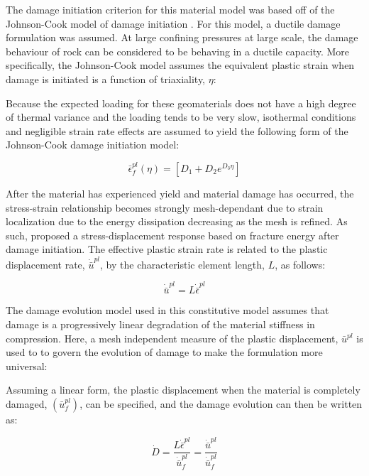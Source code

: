 The damage initiation criterion for this material model was based off of the Johnson-Cook model of damage initiation \cite{Johnson_1985}. For this model, a ductile damage formulation was assumed. At large confining pressures at large scale, the damage behaviour of rock can be considered to be behaving in a ductile capacity. More specifically, the Johnson-Cook model assumes the equivalent plastic strain when damage is initiated is a function of triaxiality, $\eta$:

Because the expected loading for these geomaterials does not have a high degree of thermal variance and the loading tends to be very slow, isothermal conditions and negligible strain rate effects are assumed to yield the following form of the Johnson-Cook damage initiation model:

\begin{equation}
\bar{\epsilon}_{f}^{pl}\left(\eta\right)=\left[D_{1}+D_{2}e^{D_{3}\eta}\right]\label{eqn:druc8}
\end{equation}

After the material has experienced yield and material damage has occurred, the stress-strain relationship becomes strongly mesh-dependant due to strain localization due to the energy dissipation decreasing as the mesh is refined. As such, \citet{Hillerborg_1976} proposed a stress-displacement response based on fracture energy after damage initiation. The effective plastic strain rate is related to the plastic displacement rate, $\dot{\bar{u}}^{pl}$, by the characteristic element length, $L$, as follows:

\begin{equation}
\dot{\bar{u}}^{pl}=L\dot{\bar{\epsilon}}^{pl}\label{eqn:druc9}
\end{equation}

The damage evolution model used in this constitutive model assumes that damage is a progressively linear degradation of the material stiffness in compression.  Here, a mesh independent measure of the plastic displacement, $\bar{u}^{pl}$ is used to to govern the evolution of damage to make the formulation more universal:


Assuming a linear form, the plastic displacement when the material is completely damaged, $(\bar{u}^{pl}_f)$, can be specified, and the damage evolution can then be written as:

\begin{equation}
\dot{D}=\frac{L\dot{\bar{\epsilon}}^{pl}}{\dot{\bar{u}}_{f}^{pl}}=\frac{\dot{\bar{u}}^{pl}}{\dot{\bar{u}}_{f}^{pl}}\label{eqn:druc9-1}
\end{equation}

